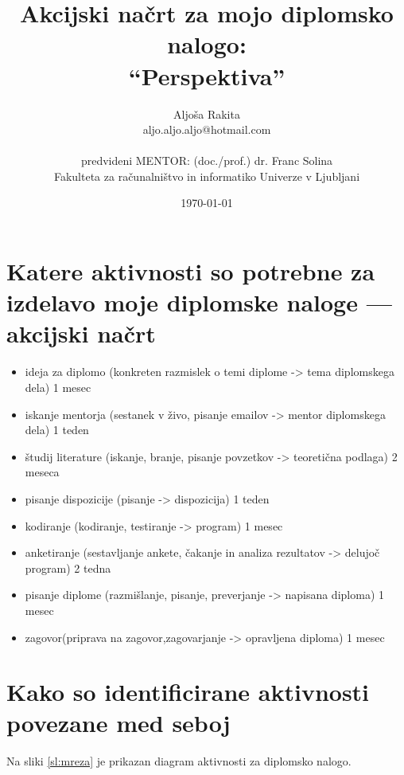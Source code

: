 \documentclass[11pt,a4paper]{article}
\title{Akcijski načrt za mojo diplomsko nalogo:\\
``Perspektiva''}
\author{Aljoša Rakita\\
aljo.aljo.aljo@hotmail.com\\
\ \\
predvideni MENTOR: (doc./prof.) dr. Franc Solina \\
Fakulteta za računalništvo in informatiko Univerze v Ljubljani
\date{\today}         
}
\begin{document}
\maketitle

\section{Katere aktivnosti so potrebne za izdelavo moje diplomske naloge --- akcijski načrt}



\begin{itemize}
  \item ideja za diplomo (konkreten razmislek o temi diplome -> tema diplomskega dela) 1 mesec
  \item iskanje mentorja (sestanek v živo, pisanje emailov -> mentor diplomskega dela) 1 teden
  \item \v{s}tudij literature (iskanje, branje, pisanje povzetkov -> teoretična podlaga) 2 meseca
  \item pisanje dispozicije (pisanje -> dispozicija) 1 teden
  \item kodiranje (kodiranje, testiranje -> program) 1 mesec
  \item anketiranje (sestavljanje ankete, čakanje in analiza rezultatov -> delujoč program) 2 tedna
  \item pisanje diplome (razmišlanje, pisanje, preverjanje -> napisana diploma) 1 mesec
  \item zagovor(priprava na zagovor,zagovarjanje -> opravljena diploma) 1 mesec
\end{itemize}

\section{Kako so identificirane aktivnosti povezane med seboj}

Na sliki \ref{sl:mreza} je prikazan  diagram aktivnosti za diplomsko nalogo.
\end{document}
